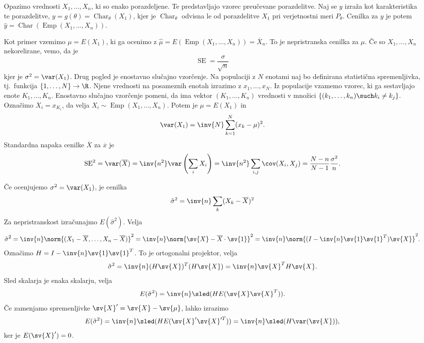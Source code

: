 

Opazimo vrednosti $X_1, \ldots, X_n$, ki so enako porazdeljene.
Te predstavljajo vzorec preučevane porazdelitve.
Naj se $y$ izraža kot karakteristika te porazdelitve, $y = g(\theta) =
\operatorname{Char}_\theta(X_1)$, kjer je $\operatorname{Char}_\theta$ odvisna
le od porazdelitve $X_1$ pri verjetnostni meri $P_\theta$.
Cenilka za $y$ je potem $\hat{y} = \operatorname{Char}(\operatorname{Emp}(X_1,
\ldots, X_n))$.


Kot primer vzemimo $\mu = E(X_1)$, ki ga ocenimo z $\hat{\mu} =
E(\operatorname{Emp}(X_1, \ldots, X_n)) = \overline{X}_n$.
To je nepristranska cenilka za $\mu$.
Če so $X_1, \ldots, X_n$ nekorelirane, vemo, da je
\[
  \operatorname{SE} = \frac{\sigma}{\sqrt{n}}
\]
kjer je $\sigma^2 = \var(X_1)$.
Drug pogled je enostavno slučajno vzorčenje.
Na populaciji z $N$ enotami naj bo definirana statistična spremenljivka,
tj.~funkcija $\{1, \ldots, N\} \to \R$.
Njene vrednosti na posameznih enotah izrazimo z $x_1, \ldots, x_N$.
Iz populacije vzamemo vzorec, ki ga sestavljajo enote $K_1, \ldots, K_n$.
Enostavno slučajno vzorčenje pomeni, da ima vektor $(K_1, \ldots, K_n)$
vrednosti v množici $\{(k_1, \ldots, k_n) \such k_i \ne k_j\}$.
Označimo $X_i = x_{K_i}$, da velja $X_i \sim \operatorname{Emp}(X_1, \ldots,
X_n)$.
Potem je $\mu = E(X_1)$ in
\[
  \var(X_1) = \inv{N} \sum_{k=1}^N (x_k - \mu)^2.
\]
Standardna napaka cenilke $\overline{X}$ za $\overline{x}$ je
\[
  \operatorname{SE}^2
  = \var(\overline{X})
  = \inv{n^2} \var\left(\sum_i X_i\right)
  = \inv{n^2} \sum_{i,j} \cov(X_i, X_j)
  = \frac{N-n}{N-1} \frac{\sigma^2}{n}.
\]


Če ocenjujemo $\sigma^2 = \var(X_1)$, je cenilka
\[
  \hat{\sigma}^2 = \inv{n} \sum_k (X_k - \overline{X})^2
\]
Za nepristranskost izračunajmo $E(\hat{\sigma}^2)$.
Velja
\[
  \hat{\sigma}^2 = \inv{n} \norm{(X_1 - \overline{X}, \ldots, X_n -
	\overline{X})}^2
  = \inv{n} \norm{\sv{X} - \overline{X} \cdot \sv{1}}^2
  = \inv{n} \norm{(I - \inv{n} \sv{1} \sv{1}^T) \sv{X}}^2.
\]
Označimo $H = I - \inv{n} \sv{1} \sv{1}^T$.
To je ortogonalni projektor, velja
\[
  \hat{\sigma}^2 = \inv{n} (H \sv{X})^T (H \sv{X})
  = \inv{n} \sv{X}^T H \sv{X}.
\]
Sled skalarja je enaka skalarju, velja
\[
  E(\hat{\sigma}^2)
  = \inv{n} \sled (H E(\sv{X} \sv{X}^T)).
\]
Če zamenjamo spremenljivke $\sv{X}' = \sv{X} - \sv{\mu}$, lahko izrazimo
\[
  E(\hat{\sigma}^2) = \inv{n} \sled(H E(\sv{X}' \sv{X}'^T))
  = \inv{n} \sled (H \var(\sv{X})),
\]
ker je $E(\sv{X}') = 0$.

